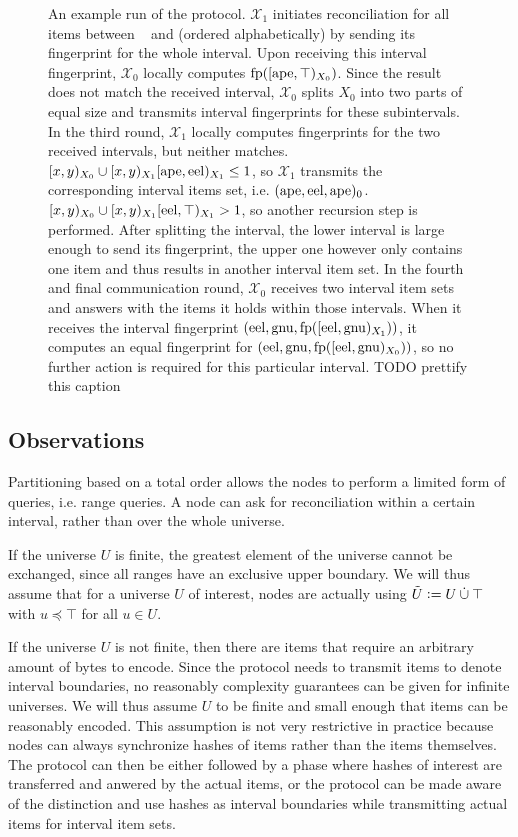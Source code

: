 \begin{figure*}
\caption{
An example run of the protocol. $\mathcal{X}_1$ initiates reconciliation for all items between \examplea~ and \examplei (ordered alphabetically) by sending its fingerprint for the whole interval.
Upon receiving this interval fingerprint, $\mathcal{X}_0$ locally computes $\operatorname{fp}([{\mathrm{ape}},{\top})_{X_0})$. Since the result does not match the received interval, $\mathcal{X}_0$ splits $X_0$ into two parts of equal size and transmits interval fingerprints for these subintervals.
In the third round, $\mathcal{X}_1$ locally computes fingerprints for the two received intervals, but neither matches. $[{x},{y})_{X_0} \cup [{x},{y})_{X_1}{[{\mathrm{ape}},{\mathrm{eel}})_{X_1}} \leq 1$, so $\mathcal{X}_1$ transmits the corresponding interval items set, i.e. $({\mathrm{ape}}, {\mathrm{eel}}, {\mathrm{ape}})_{0}$. $[{x},{y})_{X_0} \cup [{x},{y})_{X_1}{[{\mathrm{eel}},{\top})_{X_1}} > 1$, so another recursion step is performed. After splitting the interval, the lower interval is large enough to send its fingerprint, the upper one however only contains one item and thus results in another interval item set.
In the fourth and final communication round, $\mathcal{X}_0$ receives two interval item sets and answers with the items it holds within those intervals. When it receives the interval fingerprint $({\mathrm{eel}}, {\mathrm{gnu}}, {\operatorname{fp}([{\mathrm{eel}},{\mathrm{gnu}})_{X_1})})$, it computes an equal fingerprint for $({\mathrm{eel}}, {\mathrm{gnu}}, {\operatorname{fp}([{\mathrm{eel}},{\mathrm{gnu}})_{X_0})})$, so no further action is required for this particular interval. TODO prettify this caption
}

\label{simple-set-reconciliation-example}
\end{figure*}

\subsection{Observations}

Partitioning based on a total order allows the nodes to perform a limited form of queries, i.e. range queries. A node can ask for reconciliation within a certain interval, rather than over the whole universe.

If the universe $U$ is finite, the greatest element of the universe cannot be exchanged, since all ranges have an exclusive upper boundary. We will thus assume that for a universe $U$ of interest, nodes are actually using $\tilde{U} \vcentcolon= U \mathbin{\dot{\cup}} \top$ with $u \preceq \top$ for all $u \in U$.

If the universe $U$ is not finite, then there are items that require an arbitrary amount of bytes to encode. Since the protocol needs to transmit items to denote interval boundaries, no reasonably complexity guarantees can be given for infinite universes. We will thus assume $U$ to be finite and small enough that items can be reasonably encoded. This assumption is not very restrictive in practice because nodes can always synchronize hashes of items rather than the items themselves. The protocol can then be either followed by a phase where hashes of interest are transferred and anwered by the actual items, or the protocol can be made aware of the distinction and use hashes as interval boundaries while transmitting actual items for interval item sets.

